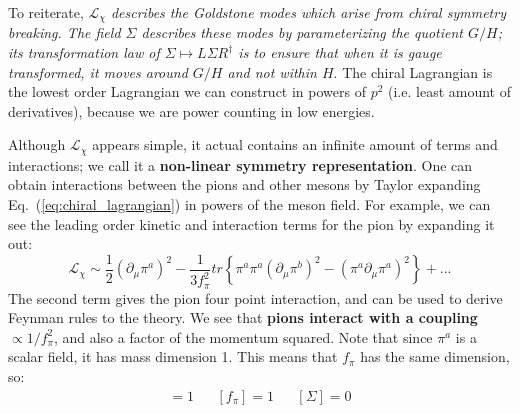 \documentclass[11pt, oneside]{article}   	%
\theoremstyle{definition}
\numberwithin{equation}{subsection}		%
\begin{document}
To reiterate, $\mathcal L_\chi$ \textit{describes the Goldstone modes which arise from chiral symmetry breaking. The field $\Sigma$ 
describes these modes by parameterizing the quotient $G / H$; its transformation law of $\Sigma\mapsto L\Sigma R^\dagger$ is 
to ensure that when it is gauge transformed, it moves around $G / H$ and not within $H$}. The chiral Lagrangian is the lowest order 
Lagrangian we can construct in powers of $p^2$ (i.e. least amount of derivatives), because we are power counting in low energies. 

Although $\mathcal L_\chi$ appears simple, it actual contains an infinite amount of terms and interactions; we call it a \textbf{non-linear 
symmetry representation}. One can obtain interactions between the pions and other mesons by Taylor expanding 
Eq.~(\ref{eq:chiral_lagrangian}) in powers of the meson field. For example, we can see the leading order kinetic and interaction 
terms for the pion by expanding it out:
\begin{equation}
	\mathcal L_\chi\sim \frac{1}{2}(\partial_\mu\pi^a)^2 - \frac{1}{3 f_\pi^2} tr\left\{\pi^a \pi^a (\partial_\mu \pi^b)^2 - (\pi^a \partial_\mu\pi^a)^2\right\} + ...
\end{equation}
The second term gives the pion four point interaction, and can be used to derive Feynman rules to the theory. We see that \textbf{pions 
interact with a coupling $\propto 1 / f_\pi^2$}, and also a factor of the momentum squared. Note that since $\pi^a$ is a scalar field, 
it has mass dimension 1. This means that $f_\pi$ has the same dimension, so:
\begin{align}
	[\pi^a] = 1 && [f_\pi] = 1 && [\Sigma] = 0
\end{align}
\end{document}
